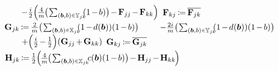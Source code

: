 \documentclass[10pt,conference]{IEEEtran}
\newcommand*{\scriptin}{\raisebox{0.15ex}{$\scriptscriptstyle \in$}}
\begin{document}
\begin{algorithm}
{{            $\quad\quad - \frac{i}{2}\Big(\hspace*{-1pt}\frac{4}{m}\hspace*{-1pt} \big(\hspace*{-1pt}\sum_{(\bm{b}, b) \scriptin \mathbb{Y}_{j k}}\hspace*{-4pt} (1\hspace*{-1pt} -\hspace*{-1pt} b)\big)\hspace*{-1pt} -\hspace*{-1pt} \mathbf{F}_{j j}\hspace*{-1pt} -\hspace*{-1pt} \mathbf{F}_{k k}\Big)$\;
            $\mathbf{F}_{k j}\hspace*{-1pt} \coloneqq\hspace*{-1pt} \overline{\mathbf{F}_{j k}}$\;
            $\mathbf{G}_{j k}\hspace*{-1pt} \coloneqq\hspace*{-1pt} \frac{2}{m} \big(\hspace*{-1pt}\sum_{(\bm{b}, b) \scriptin \mathbb{X}_{j k}}\hspace*{-4pt} (1\hspace*{-1pt} -\hspace*{-1pt} d(\bm{b})) (1\hspace*{-1pt} -\hspace*{-1pt} b)\big)$
            $\quad\quad - \frac{2 i}{m} \big(\hspace*{-1pt}\sum_{(\bm{b}, b) \scriptin \mathbb{Y}_{j k}}\hspace*{-4pt} (1\hspace*{-1pt} -\hspace*{-1pt} d(\bm{b})) (1\hspace*{-1pt} -\hspace*{-1pt} b)\big)$
            $\quad\quad + \Big(\frac{i}{2}\hspace*{-1pt} -\hspace*{-1pt} \frac{1}{2}\Big) (\mathbf{G}_{j j}\hspace*{-1pt} +\hspace*{-1pt} \mathbf{G}_{k k})$\;
            $\mathbf{G}_{k j}\hspace*{-1pt} \coloneqq\hspace*{-1pt} \overline{\mathbf{G}_{j k}}$\;
            $\mathbf{H}_{j k}\hspace*{-1pt} \coloneqq\hspace*{-1pt} \frac{1}{2} \Big(\hspace*{-1pt}\frac{4}{m}\hspace*{-1pt} \big(\hspace*{-1pt}\sum_{(\bm{b}, b) \scriptin \mathbb{X}_{j k}}\hspace*{-4pt} c(\bm{b}) (1\hspace*{-1pt} -\hspace*{-1pt} b)\big)\hspace*{-1pt} -\hspace*{-1pt} \mathbf{H}_{j j}\hspace*{-1pt} -\hspace*{-1pt} \mathbf{H}_{k k}\hspace*{-1pt}\Big)$
}}
\end{algorithm}
\end{document}

